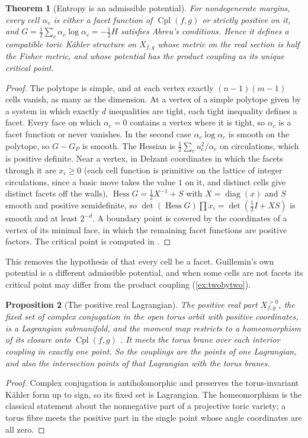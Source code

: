 \documentclass[11pt]{article}
\newtheorem{theorem}{Theorem}[section]
\newtheorem{proposition}[theorem]{Proposition}
\theoremstyle{definition}
\theoremstyle{remark}
\newcommand{\Cpl}{\operatorname{Cpl}}
\newcommand{\diag}{\operatorname{diag}}
\newcommand{\Hess}{\operatorname{Hess}}
\begin{document}
\begin{theorem}[Entropy is an admissible potential]\label{thm:abreu}
For nondegenerate margins, every cell $\alpha_c$ is either a facet function of $\Cpl(f,g)$ or strictly positive on it, and
$G=\frac12\sum_c\alpha_c\log\alpha_c=-\frac12H$ satisfies Abreu's conditions. Hence it defines a compatible toric Kähler structure on
$X_{f,g}$ whose metric on the real section is half the Fisher metric, and whose potential has the product coupling as its unique
critical point.
\end{theorem}
\begin{proof}
The polytope is simple, and at each vertex exactly $(n-1)(m-1)$ cells vanish, as many as the dimension. At a vertex of a simple
polytope given by a system in which exactly $d$ inequalities are tight, each tight inequality defines a facet. Every face on which
$\alpha_c=0$ contains a vertex where it is tight, so $\alpha_c$ is a facet function or never vanishes. In the second case
$\alpha_c\log\alpha_c$ is smooth on the polytope, so $G-G_P$ is smooth. The Hessian is $\frac12\sum_c u_c^2/\alpha_c$ on circulations, which is
positive definite. Near a vertex, in Delzant coordinates in which the facets through it are $x_i\ge0$ (each cell
function is primitive on the lattice of integer circulations, since a basic move takes the value $1$ on it, and distinct cells give
distinct facets off the walls), $\Hess G=\frac12X^{-1}+S$
with $X=\diag(x)$ and $S$ smooth and positive semidefinite, so $\det(\Hess G)\prod x_i=\det(\frac12I+XS)$ is smooth and at least
$2^{-d}$. A boundary point is covered by the coordinates of a vertex of its minimal face, in which the remaining facet functions
are positive factors. The critical point is computed in \cite[Prop.~6.5]{Conditionals}.
\end{proof}

This removes the hypothesis of \cite[Prop.~6.5]{Conditionals} that every cell be a facet. Guillemin's own potential is a
different admissible potential, and when some cells are not facets its critical point may differ from the product coupling
(\cref{ex:twobytwo}).

\begin{proposition}[The positive real Lagrangian]\label{prop:realpositive}
The positive real part $X_{f,g}^{>0}$, the fixed set of complex conjugation in the open torus orbit with positive coordinates, is a
Lagrangian submanifold, and the moment map restricts to a homeomorphism of its closure onto $\Cpl(f,g)$ \cite{Fulton1993}. It meets the
torus brane over each interior coupling in exactly one point. So the couplings are the points of one Lagrangian, and also the
intersection points of that Lagrangian with the torus branes.
\end{proposition}
\begin{proof}
Complex conjugation is antiholomorphic and preserves the torus-invariant Kähler form up to sign, so its fixed set is Lagrangian. The
homeomorphism is the classical statement about the nonnegative part of a projective toric variety; a torus fibre meets the positive
part in the single point whose angle coordinates are all zero.
\end{proof}
\end{document}
